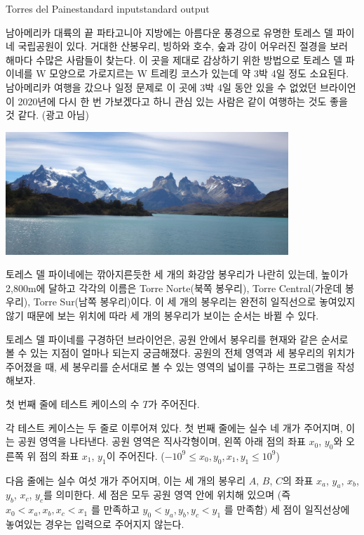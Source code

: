 \begin{problem}{Torres del Paine}{standard input}{standard output}

남아메리카 대륙의 끝 파타고니아 지방에는 아름다운 풍경으로 유명한 토레스 델 파이네 국립공원이 있다. 거대한 산봉우리, 빙하와 호수, 숲과 강이 어우러진 절경을 보러 해마다 수많은 사람들이 찾는다. 이 곳을 제대로 감상하기 위한 방법으로 토레스 델 파이네를 W 모양으로 가로지르는 W 트레킹 코스가 있는데 약 3박 4일 정도 소요된다. 남아메리카 여행을 갔으나 일정 문제로 이 곳에 3박 4일 동안 있을 수 없었던 브라이언이 2020년에 다시 한 번 가보겠다고 하니 관심 있는 사람은 같이 여행하는 것도 좋을 것 같다. (광고 아님)

\begin{center}
  \includegraphics[width=0.8\textwidth]{torres.jpg}
\end{center}

토레스 델 파이네에는 깎아지른듯한 세 개의 화강암 봉우리가 나란히 있는데, 높이가 2,800m에 달하고 각각의 이름은 Torre Norte(북쪽 봉우리), Torre Central(가운데 봉우리), Torre Sur(남쪽 봉우리)이다. 이 세 개의 봉우리는 완전히 일직선으로 놓여있지 않기 때문에 보는 위치에 따라 세 개의 봉우리가 보이는 순서는 바뀔 수 있다.

토레스 델 파이네를 구경하던 브라이언은, 공원 안에서 봉우리를 현재와 같은 순서로 볼 수 있는 지점이 얼마나 되는지 궁금해졌다. 공원의 전체 영역과 세 봉우리의 위치가 주어졌을 때, 세 봉우리를 순서대로 볼 수 있는 영역의 넓이를 구하는 프로그램을 작성해보자.

\InputFile
첫 번째 줄에 테스트 케이스의 수 $T$가 주어진다.

각 테스트 케이스는 두 줄로 이루어져 있다. 첫 번째 줄에는 실수 네 개가 주어지며, 이는 공원 영역을 나타낸다. 공원 영역은 직사각형이며, 왼쪽 아래 점의 좌표 $x_0$, $y_0$와 오른쪽 위 점의 좌표 $x_1$, $y_1$이 주어진다. ($-10^9 \le x_0, y_0, x_1, y_1 \le 10^9$)

다음 줄에는 실수 여섯 개가 주어지며, 이는 세 개의 봉우리 $A$, $B$, $C$의 좌표 $x_a$, $y_a$, $x_b$, $y_b$, $x_c$, $y_c$를 의미한다. 세 점은 모두 공원 영역 안에 위치해 있으며 (즉 $x_0 < x_a , x_b , x_c < x_1$ 를 만족하고 $y_0 < y_a , y_b , y_c < y_1$ 를 만족함) 세 점이 일직선상에 놓여있는 경우는 입력으로 주어지지 않는다.


\end{problem}
